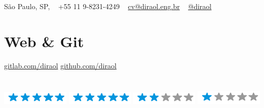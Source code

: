 \documentclass[]{friggeri-cv}
\begin{document}
\thispagestyle{empty}
%
%

%
%
\begin{asidefp}
  \section{}
    \pin \hfill São Paulo, SP, %
~
    {\Large\textcolor{gray}{\Mobilefone}} \hfill +55 11 9-8231-4249%
~
    {\Large\textcolor{gray}{\Letter}} \hfill \href{mailto:cv@diraol.eng.br}{cv@diraol.eng.br}%
~
    \tlogo \hfill \href{http://twitter.com/diraol}{@diraol}%
~
    \llogo \hfill {}%
~
  \section{Web \& Git}
    \href{https://gitlab.com/diraol}{gitlab.com/diraol}
    \href{https://github.com/diraol}{github.com/diraol}
    ~%
  \section{}
    \textbf{}\includegraphics[scale=0.40]{img/5stars.png}
    \textbf{}\includegraphics[scale=0.40]{img/5stars.png}
    \textbf{}\includegraphics[scale=0.40]{img/2stars.png}
    \textbf{}\includegraphics[scale=0.40]{img/1stars.png}
\end{asidefp}
\end{document}
